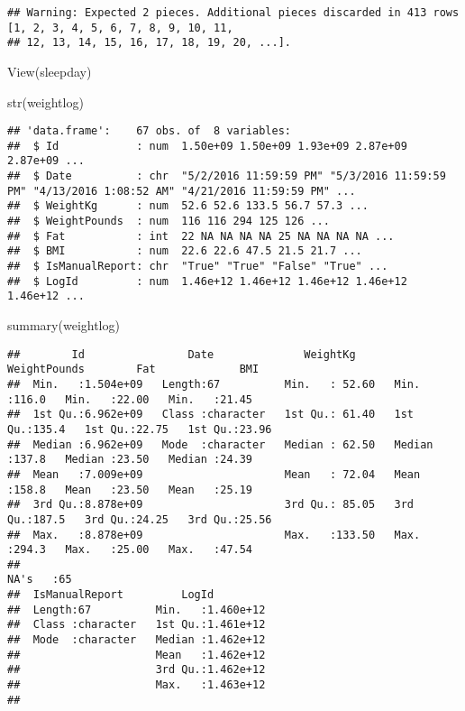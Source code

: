 \documentclass[
]{article}
\newenvironment{Shaded}{\begin{snugshade}}{\end{snugshade}}
\newcommand{\FunctionTok}[1]{\textcolor[rgb]{0.00,0.00,0.00}{#1}}
\newcommand{\NormalTok}[1]{#1}
\begin{document}
\begin{verbatim}
## Warning: Expected 2 pieces. Additional pieces discarded in 413 rows [1, 2, 3, 4, 5, 6, 7, 8, 9, 10, 11,
## 12, 13, 14, 15, 16, 17, 18, 19, 20, ...].
\end{verbatim}

\begin{Shaded}
\begin{Highlighting}[]
\FunctionTok{View}\NormalTok{(sleepday)}

\FunctionTok{str}\NormalTok{(weightlog)}
\end{Highlighting}
\end{Shaded}

\begin{verbatim}
## 'data.frame':    67 obs. of  8 variables:
##  $ Id            : num  1.50e+09 1.50e+09 1.93e+09 2.87e+09 2.87e+09 ...
##  $ Date          : chr  "5/2/2016 11:59:59 PM" "5/3/2016 11:59:59 PM" "4/13/2016 1:08:52 AM" "4/21/2016 11:59:59 PM" ...
##  $ WeightKg      : num  52.6 52.6 133.5 56.7 57.3 ...
##  $ WeightPounds  : num  116 116 294 125 126 ...
##  $ Fat           : int  22 NA NA NA NA 25 NA NA NA NA ...
##  $ BMI           : num  22.6 22.6 47.5 21.5 21.7 ...
##  $ IsManualReport: chr  "True" "True" "False" "True" ...
##  $ LogId         : num  1.46e+12 1.46e+12 1.46e+12 1.46e+12 1.46e+12 ...
\end{verbatim}

\begin{Shaded}
\begin{Highlighting}[]
\FunctionTok{summary}\NormalTok{(weightlog)}
\end{Highlighting}
\end{Shaded}

\begin{verbatim}
##        Id                Date              WeightKg       WeightPounds        Fat             BMI       
##  Min.   :1.504e+09   Length:67          Min.   : 52.60   Min.   :116.0   Min.   :22.00   Min.   :21.45  
##  1st Qu.:6.962e+09   Class :character   1st Qu.: 61.40   1st Qu.:135.4   1st Qu.:22.75   1st Qu.:23.96  
##  Median :6.962e+09   Mode  :character   Median : 62.50   Median :137.8   Median :23.50   Median :24.39  
##  Mean   :7.009e+09                      Mean   : 72.04   Mean   :158.8   Mean   :23.50   Mean   :25.19  
##  3rd Qu.:8.878e+09                      3rd Qu.: 85.05   3rd Qu.:187.5   3rd Qu.:24.25   3rd Qu.:25.56  
##  Max.   :8.878e+09                      Max.   :133.50   Max.   :294.3   Max.   :25.00   Max.   :47.54  
##                                                                          NA's   :65                     
##  IsManualReport         LogId          
##  Length:67          Min.   :1.460e+12  
##  Class :character   1st Qu.:1.461e+12  
##  Mode  :character   Median :1.462e+12  
##                     Mean   :1.462e+12  
##                     3rd Qu.:1.462e+12  
##                     Max.   :1.463e+12  
## 
\end{verbatim}
\end{document}
